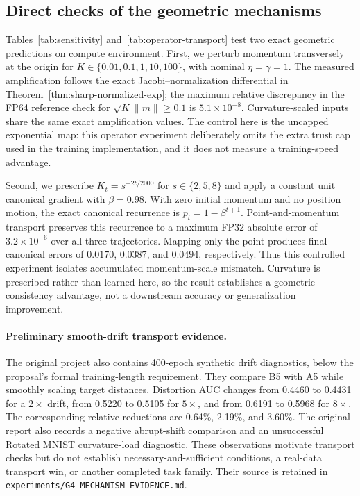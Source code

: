 \subsection{Direct checks of the geometric mechanisms}
\label{sec:revision-operator-checks}
Tables~\ref{tab:sensitivity} and~\ref{tab:operator-transport} test two exact geometric predictions on compute environment. First, we perturb momentum transversely at the origin for $K\in\{0.01,0.1,1,10,100\}$, with nominal $\eta=\gamma=1$. The measured amplification follows the exact Jacobi--normalization differential in Theorem~\ref{thm:sharp-normalized-exp}; the maximum relative discrepancy in the FP64 reference check for $\sqrt K\|m\|\ge0.1$ is $5.1\times10^{-8}$. Curvature-scaled inputs share the same exact amplification values. The control here is the uncapped exponential map: this operator experiment deliberately omits the extra trust cap used in the training implementation, and it does not measure a training-speed advantage.

Second, we prescribe $K_t=s^{-2t/2000}$ for $s\in\{2,5,8\}$ and apply a constant unit canonical gradient with $\beta=0.98$. With zero initial momentum and no position motion, the exact canonical recurrence is $p_t=1-\beta^{t+1}$. Point-and-momentum transport preserves this recurrence to a maximum FP32 absolute error of $3.2\times10^{-6}$ over all three trajectories. Mapping only the point produces final canonical errors of $0.0170$, $0.0387$, and $0.0494$, respectively. Thus this controlled experiment isolates accumulated momentum-scale mismatch. Curvature is prescribed rather than learned here, so the result establishes a geometric consistency advantage, not a downstream accuracy or generalization improvement.




\paragraph{Preliminary smooth-drift transport evidence.}
The original project also contains 400-epoch synthetic drift diagnostics, below the proposal's formal training-length requirement. They compare B5 with A5 while smoothly scaling target distances. Distortion AUC changes from 0.4460 to 0.4431 for a $2\times$ drift, from 0.5220 to 0.5105 for $5\times$, and from 0.6191 to 0.5968 for $8\times$. The corresponding relative reductions are 0.64\%, 2.19\%, and 3.60\%. The original report also records a negative abrupt-shift comparison and an unsuccessful Rotated MNIST curvature-load diagnostic. These observations motivate transport checks but do not establish necessary-and-sufficient conditions, a real-data transport win, or another completed task family. Their source is retained in \texttt{experiments/G4\_MECHANISM\_EVIDENCE.md}.

